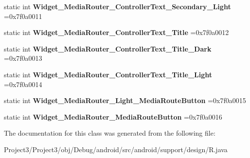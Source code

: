 \begin{DoxyCompactItemize}
static int {\bfseries Widget\+\_\+\+Media\+Router\+\_\+\+Controller\+Text\+\_\+\+Secondary\+\_\+\+Light} =0x7f0a0011
\item 
\mbox{\label{classandroid_1_1support_1_1design_1_1R_1_1style_afc6d421a210f5bb96d9e7810b7a78766}} 
static int {\bfseries Widget\+\_\+\+Media\+Router\+\_\+\+Controller\+Text\+\_\+\+Title} =0x7f0a0012
\item 
\mbox{\label{classandroid_1_1support_1_1design_1_1R_1_1style_ab79797e9f9ca90103fe2a417b224397d}} 
static int {\bfseries Widget\+\_\+\+Media\+Router\+\_\+\+Controller\+Text\+\_\+\+Title\+\_\+\+Dark} =0x7f0a0013
\item 
\mbox{\label{classandroid_1_1support_1_1design_1_1R_1_1style_a63b5f53fb1de561f1b202dc02e14d059}} 
static int {\bfseries Widget\+\_\+\+Media\+Router\+\_\+\+Controller\+Text\+\_\+\+Title\+\_\+\+Light} =0x7f0a0014
\item 
\mbox{\label{classandroid_1_1support_1_1design_1_1R_1_1style_a3b7e68273332e0367e1cfc83198c8ede}} 
static int {\bfseries Widget\+\_\+\+Media\+Router\+\_\+\+Light\+\_\+\+Media\+Route\+Button} =0x7f0a0015
\item 
\mbox{\label{classandroid_1_1support_1_1design_1_1R_1_1style_a0392e6dd29d4c69188be6749706e9567}} 
static int {\bfseries Widget\+\_\+\+Media\+Router\+\_\+\+Media\+Route\+Button} =0x7f0a0016
\end{DoxyCompactItemize}


The documentation for this class was generated from the following file\+:\begin{DoxyCompactItemize}
\item 
Project3/\+Project3/obj/\+Debug/android/src/android/support/design/R.\+java\end{DoxyCompactItemize}
